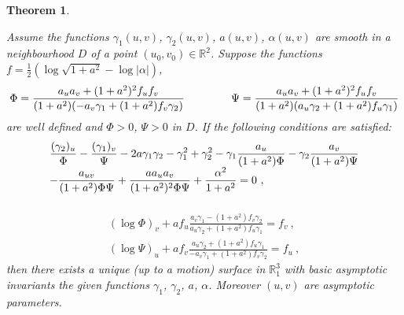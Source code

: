 \documentclass[12pt]{amsart}
\newtheorem{thm}{Theorem}[section]
\theoremstyle{definition}
\theoremstyle{remark}
\newcommand{\ds}{\displaystyle}
\begin{document}
\begin{thm} \label{eq:Bonnet-typeTheorem}

Assume the functions $\gamma_1(u,v)$, $\gamma_2(u,v)$, $a(u,v)$, $\alpha(u,v)$ are smooth in a neighbourhood 
$ D $ of a point $(u_0,v_0) \in \mathbb R^2$. Suppose the functions
$ f=\frac12 \left( \log\sqrt{1+a^2}-\log|\alpha| \right) $,
$$
	\Phi= \frac{a_ua_v+(1+a^2)^2f_uf_v}{(1+a^2)(-a_v\gamma_1+(1+a^2)f_v\gamma_2)}   \hspace{1.5cm}
		 \Psi=\frac{a_ua_v+(1+a^2)^2f_uf_v}{(1+a^2)(a_u\gamma_2+(1+a^2)f_u\gamma_1)}
$$
are well defined and $\Phi>0$, $\Psi>0$ in $D$. If the following conditions are satisfied:
\begin{equation} \label{eq:GaussEquation-2}
	\begin{array}{l}
		\ds \frac{(\gamma_2)_u}{\Phi}-\frac{(\gamma_1)_v}{\Psi}-2a\gamma_1\gamma_2 -\gamma_1^2+\gamma_2^2
			-\gamma_1 \frac{a_u}{(1+a^2)\Phi}	-\gamma_2\frac{a_v}{(1+a^2)\Psi} \\
			\ds -\frac{a_{uv}}{(1+a^2)\Phi\Psi}+\frac{aa_ua_v}{(1+a^2)^2\Phi\Psi}
		+\frac{\alpha^2}{1+a^2}=0    \vspace{0.3cm}    \ , \\
	\end{array}
\end{equation}
\begin{equation} \label{eq:EquationsOfCodazzi-2}
	\begin{array}{l}
		\ds (\log\Phi)_v+af_u\frac{a_v\gamma_1-(1+a^2)f_v\gamma_2}{a_u\gamma_2+(1+a^2)f_u\gamma_1}=f_v \ , \\
		\ds (\log\Psi)_u+af_v\frac{a_u\gamma_2+(1+a^2)f_u\gamma_1}{-a_v\gamma_1+(1+a^2)f_v\gamma_2}=f_u \ ,
	\end{array}
\end{equation}  
then there exists a unique (up to a motion) surface in $\mathbb R^3_1$ with basic
asymptotic invariants the given functions $\gamma_1$, $\gamma_2$, $a$, $\alpha$.
Moreover $(u,v)$ are asymptotic parameters.
\end{thm}
\end{document}
